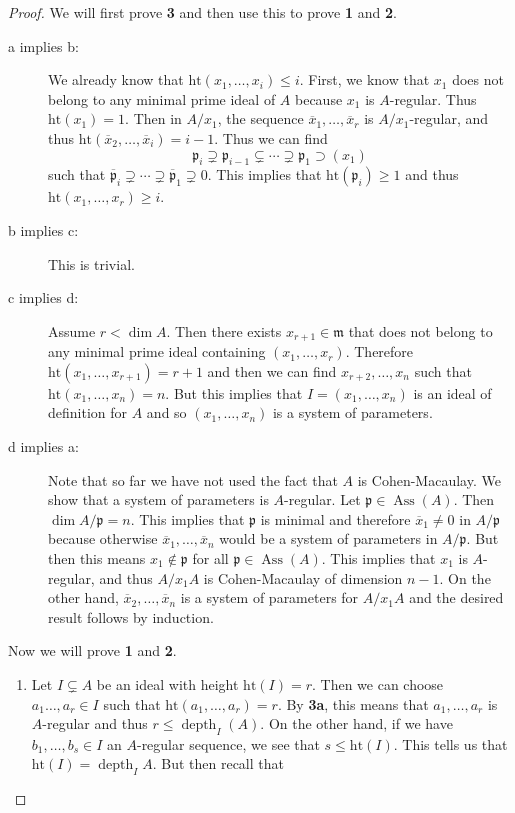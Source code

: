 \documentclass[leqno, openany]{memoir}
\theoremstyle{definition}
\theoremstyle{remark}
\theoremstyle{plain}
\theoremstyle{definition}
\theoremstyle{remark}
\newcommand{\mf}[1]{\mathfrak{#1}}
\newcommand{\mr}[1]{\mathrm{#1}}
\newcommand{\ol}[1]{\overline{#1}}
\DeclareMathOperator{\Ass}{Ass}
\DeclareMathOperator{\dpth}{depth}
\begin{document}
\begin{proof}
    We will first prove \textbf{3} and then use this to prove \textbf{1} and \textbf{2}.
    \begin{description}
        \item[a implies b:] We already know that $\mr{ht}(x_1, \ldots, x_i) \leq i$. First, we know that $x_1$ does not belong to any minimal prime ideal of $A$ because $x_1$ is $A$-regular. Thus $\mr{ht}(x_1) = 1$. Then in $A/x_1$, the sequence $\ol{x}_1, \ldots, \ol{x}_r$ is $A/x_1$-regular, and thus $\mr{ht}(\ol{x}_2, \ldots, \ol{x}_i) = i-1$. Thus we can find 
            \[ \mf{p}_i \supsetneq \mf{p}_{i-1} \subsetneq \cdots \supsetneq \mf{p}_1 \supset (x_1) \]
            such that $\ol{\mf{p}}_i \supsetneq \cdots \supsetneq \ol{\mf{p}}_1 \supsetneq 0$. This implies that $\mr{ht}(\mf{p}_i) \geq 1$ and thus $\mr{ht}(x_1, \ldots, x_r) \geq i$.
        \item[b implies c:] This is trivial.
        \item[c implies d:] Assume $r < \dim A$. Then there exists $x_{r+1} \in \mf{m}$ that does not belong to any minimal prime ideal containing $(x_1, \ldots, x_r)$. Therefore $\mr{ht}(x_1, \ldots, x_{r+1}) = r+1$ and then we can find $x_{r+2}, \ldots, x_n$ such that $\mr{ht}(x_1, \ldots, x_n) = n$. But this implies that $I = (x_1, \ldots, x_n)$ is an ideal of definition for $A$ and so $(x_1, \ldots, x_n)$ is a system of parameters.
        \item[d implies a:] Note that so far we have not used the fact that $A$ is Cohen-Macaulay. We show that a system of parameters is $A$-regular. Let $\mf{p} \in \Ass(A)$. Then $\dim A/\mf{p} = n$. This implies that $\mf{p}$ is minimal and therefore $\ol{x}_1 \neq 0$ in $A/\mf{p}$ because otherwise $\ol{x}_1, \ldots, \ol{x}_n$ would be a system of parameters in $A/\mf{p}$. But then this means $x_1 \notin \mf{p}$ for all $\mf{p} \in \Ass(A)$. This implies that $x_1$ is $A$-regular, and thus $A/x_1 A$ is Cohen-Macaulay of dimension $n-1$. On the other hand, $\ol{x}_2, \ldots, \ol{x}_n$ is a system of parameters for $A/x_1 A$ and the desired result follows by induction.
    \end{description}
    Now we will prove \textbf{1} and \textbf{2}.
    \begin{enumerate}
        \item Let $I \subsetneq A$ be an ideal with height $\mr{ht}(I) = r$. Then we can choose $a_1 \ldots, a_r \in I$ such that $\mr{ht}(a_1, \ldots, a_r) = r$. By \textbf{3a}, this means that $a_1, \ldots, a_r$ is $A$-regular and thus $r \leq \dpth_I (A)$. On the other hand, if we have $b_1, \ldots, b_s \in I$ an $A$-regular sequence, we see that $s \leq \mr{ht}(I)$. This tells us that $\mr{ht}(I) = \dpth_I A$. But then recall that 

\end{enumerate}
\end{proof}
\end{document}
